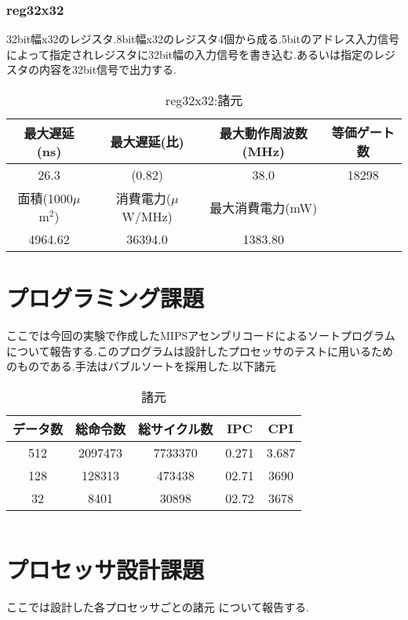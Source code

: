 \documentclass[11pt,a4j]{jarticle}
\begin{document}
\subsubsection{reg32x32}
32bit幅x32のレジスタ.8bit幅x32のレジスタ4個から成る.5bitのアドレス入力信号によって指定されレジスタに32bit幅の入力信号を書き込む.あるいは指定のレジスタの内容を32bit信号で出力する.
\begin{table}[htb]
\caption{reg32x32:諸元}
\begin{tabular}{|c|c|c|c|} \hline
最大遅延(ns) & 最大遅延(比) & 最大動作周波数(MHz) & 等価ゲート数 \\ \hline
26.3 & (0.82) & 38.0 & 18298 \\ \hline \hline 
面積(1000$\mu$m$^2$) & 消費電力($\mu$W/MHz) & 最大消費電力(mW) & \\ \hline
4964.62 & 36394.0 & 1383.80 & \\ \hline
\end{tabular}
\end{table}

\section{プログラミング課題}
ここでは今回の実験で作成したMIPSアセンブリコードによるソートプログラムについて報告する.このプログラムは設計したプロセッサのテストに用いるためのものである.手法はバブルソートを採用した.以下諸元

\begin{table}[htb]
\caption{諸元}
\begin{tabular}{|c|c|c|c|c|} \hline
データ数 & 総命令数 & 総サイクル数 & IPC & CPI \\ \hline
512 & 2097473 & 7733370 & 0.271 & 3.687 \\ \hline
128 & 128313 & 473438 & 02.71 & 3690 \\ \hline
32 & 8401 & 30898 & 02.72 & 3678 \\ \hline
\end{tabular}
\end{table}
\begin{verbatim}
\end{verbatim}

\section{プロセッサ設計課題}
ここでは設計した各プロセッサごとの諸元
について報告する.
\end{document}
